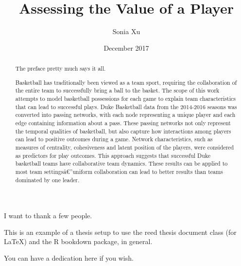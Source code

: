 \documentclass[12pt,twoside]{dukestatscithesis}
\title{Assessing the Value of a Player}
\author{Sonia Xu}
\date{December 2017}
\theoremstyle{definition}
\theoremstyle{definition}
\theoremstyle{definition}
\theoremstyle{remark}
\begin{document}
  \maketitle

\frontmatter %
\pagestyle{empty} %
  \begin{acknowledgements}
    I want to thank a few people.
  \end{acknowledgements}
  \begin{preface}
    This is an example of a thesis setup to use the reed thesis document
    class (for LaTeX) and the R bookdown package, in general.
  \end{preface}
  \hypersetup{linkcolor=black}
  \setcounter{tocdepth}{2}
  \tableofcontents

  \listoftables

  \listoffigures
  \begin{abstract}
    The preface pretty much says it all. \par
    
    Basketball has traditionally been viewed as a team sport, requiring the
    collaboration of the entire team to successfully bring a ball to the
    basket. The scope of this work attempts to model basketball possessions
    for each game to explain team characteristics that can lead to
    successful plays. Duke Basketball data from the 2014-2016 seasons was
    converted into passing networks, with each node representing a unique
    player and each edge containing information about a pass. These passing
    networks not only represent the temporal qualities of basketball, but
    also capture how interactions among players can lead to positive
    outcomes during a game. Network characteristics, such as measures of
    centrality, cohesiveness and latent position of the players, were
    considered as predictors for play outcomes. This approach suggests that
    successful Duke basketball teams have collaborative team dynamics. These
    results can be applied to most team settingsâ\euro{}''uniform
    collaboration can lead to better results than teams dominated by one
    leader.
  \end{abstract}
  \begin{dedication}
    You can have a dedication here if you wish.
  \end{dedication}
\mainmatter %
\pagestyle{fancyplain} %
\end{document}
